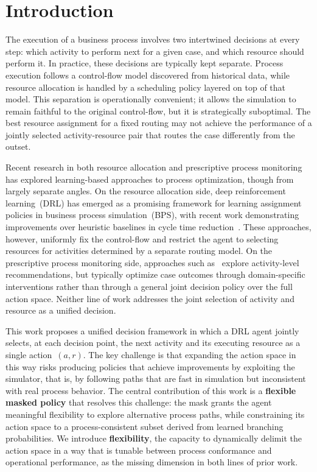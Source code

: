 \documentclass[journal,onecolumn]{IEEEtran}
\begin{document}
\IEEEpeerreviewmaketitle


\clearpage
\tableofcontents
\clearpage
\listoftables
\listoffigures
\vfill


\section{Introduction}
\label{sec:introduction}

The execution of a business process involves two intertwined decisions at every
step: which activity to perform next for a given case, and which resource should
perform it. In practice, these decisions are typically kept separate. Process
execution follows a control-flow model discovered from historical data, while
resource allocation is handled by a scheduling policy layered on top of that model.
This separation is operationally convenient; it allows the simulation to remain
faithful to the original control-flow, but it is strategically suboptimal. The
best resource assignment for a fixed routing may not achieve the performance of a
jointly selected activity-resource pair that routes the case differently from the
outset.

Recent research in both resource allocation and prescriptive process monitoring has
explored learning-based approaches to process optimization, though from largely
separate angles. On the resource allocation side, deep reinforcement learning~(DRL)
has emerged as a promising framework for learning assignment policies in business
process simulation~(BPS), with recent work demonstrating improvements over heuristic
baselines in cycle time reduction~\cite{Optimizing_Resource_Allocation_Policies,
Learning_policies_drl}. These approaches, however, uniformly fix the control-flow
and restrict the agent to selecting resources for activities determined by a separate
routing model. On the prescriptive process monitoring side, approaches such
as~\cite{ppm_optimal_policy_temporal_data, ppm_resource_constraints} explore
activity-level recommendations, but typically optimize case outcomes through
domain-specific interventions rather than through a general joint decision policy
over the full action space. Neither line of work addresses the joint selection of
activity and resource as a unified decision.

This work proposes a unified decision framework in which a DRL agent jointly
selects, at each decision point, the next activity and its executing resource as a
single action~$(a, r)$. The key challenge is that expanding the action space in this
way risks producing policies that achieve improvements by exploiting the simulator,
that is, by following paths that are fast in simulation but inconsistent with real
process behavior. The central contribution of this work is a \textbf{flexible
masked policy} that resolves this challenge: the mask grants the agent meaningful
flexibility to explore alternative process paths, while constraining its action space
to a process-consistent subset derived from learned branching probabilities. We
introduce \textbf{flexibility}, the capacity to dynamically delimit the action space
in a way that is tunable between process conformance and operational
performance, as the missing dimension in both lines of prior work.
\end{document}
